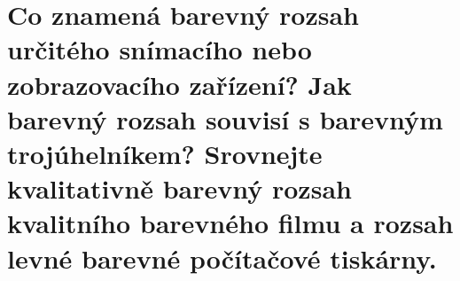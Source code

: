 \section{Co znamená barevný rozsah určitého snímacího nebo zobrazovacího zařízení? Jak barevný rozsah souvisí s barevným 
trojúhelníkem? Srovnejte kvalitativně barevný rozsah kvalitního barevného filmu a rozsah levné barevné počítačové 
tiskárny.}